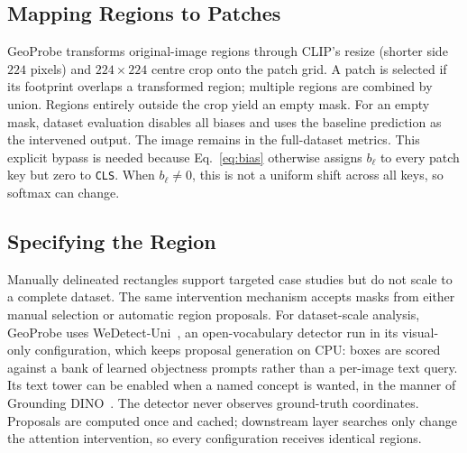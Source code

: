 \subsection{Mapping Regions to Patches}

GeoProbe transforms original-image regions through CLIP's resize (shorter
side $224$ pixels) and $224\times224$ centre crop onto the patch grid.
A patch is selected if its footprint overlaps a transformed region;
multiple regions are combined by union. Regions entirely outside the crop
yield an empty mask.
For an empty mask, dataset evaluation disables all biases and uses the
baseline prediction as the intervened output. The image remains in the
full-dataset metrics.
This explicit bypass is needed because Eq.~\ref{eq:bias} otherwise assigns
$b_\ell$ to every patch key but zero to \texttt{CLS}. When $b_\ell\ne0$,
this is not a uniform shift across all keys, so softmax can change.

\subsection{Specifying the Region}

Manually delineated rectangles support targeted case studies but do not scale
to a complete dataset. The same intervention mechanism accepts masks from either manual selection or automatic region proposals. For dataset-scale analysis, GeoProbe uses
WeDetect-Uni~\cite{fu2026wedetect}, an open-vocabulary detector run in its
visual-only configuration, which keeps proposal generation on CPU: boxes are
scored against a bank of learned objectness prompts rather than a per-image
text query. Its text tower can be enabled
when a named concept is wanted, in the manner of Grounding
DINO~\cite{liu2024grounding}. The detector never observes ground-truth
coordinates. Proposals are computed once and
cached; downstream layer searches only change the attention intervention, so
every configuration receives identical regions.

